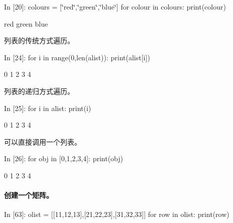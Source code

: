 \documentclass[letterpaper,10pt,english]{sphinxmanual}
\def\PYGZdq{\char`\"}
\begin{document}
\begin{OriginalVerbatim}[commandchars=\\\{\}]
\textcolor{nbsphinxin}{In [20]: }colours = [\PYGZdq{}red\PYGZdq{},\PYGZdq{}green\PYGZdq{},\PYGZdq{}blue\PYGZdq{}]
         for colour in colours:
             print(colour)
\end{OriginalVerbatim}
\begin{OriginalVerbatim}[commandchars=\\\{\}]
red
green
blue
\end{OriginalVerbatim}
列表的传统方式遍历。

\begin{OriginalVerbatim}[commandchars=\\\{\}]
\textcolor{nbsphinxin}{In [24]: }for i in range(0,len(alist)):
             print(alist[i])
\end{OriginalVerbatim}
\begin{OriginalVerbatim}[commandchars=\\\{\}]
0
1
2
3
4
\end{OriginalVerbatim}
列表的递归方式遍历。

\begin{OriginalVerbatim}[commandchars=\\\{\}]
\textcolor{nbsphinxin}{In [25]: }for i in alist:
             print(i)
\end{OriginalVerbatim}
\begin{OriginalVerbatim}[commandchars=\\\{\}]
0
1
2
3
4
\end{OriginalVerbatim}
可以直接调用一个列表。

\begin{OriginalVerbatim}[commandchars=\\\{\}]
\textcolor{nbsphinxin}{In [26]: }for obj in [0,1,2,3,4]:
             print(obj)
\end{OriginalVerbatim}
\begin{OriginalVerbatim}[commandchars=\\\{\}]
0
1
2
3
4
\end{OriginalVerbatim}

\paragraph{创建一个矩阵。}
\label{pystart_databasic:_u521b_u5efa_u4e00_u4e2a_u77e9_u9635_u3002}
\begin{OriginalVerbatim}[commandchars=\\\{\}]
\textcolor{nbsphinxin}{In [63]: }olist = [[11,12,13],[21,22,23],[31,32,33]]
         for row in olist:
             print(row)
\end{OriginalVerbatim}
\begin{OriginalVerbatim}[commandchars=\\\{\}]
[11, 12, 13]
[21, 22, 23]
[31, 32, 33]
\end{OriginalVerbatim}
\end{document}
